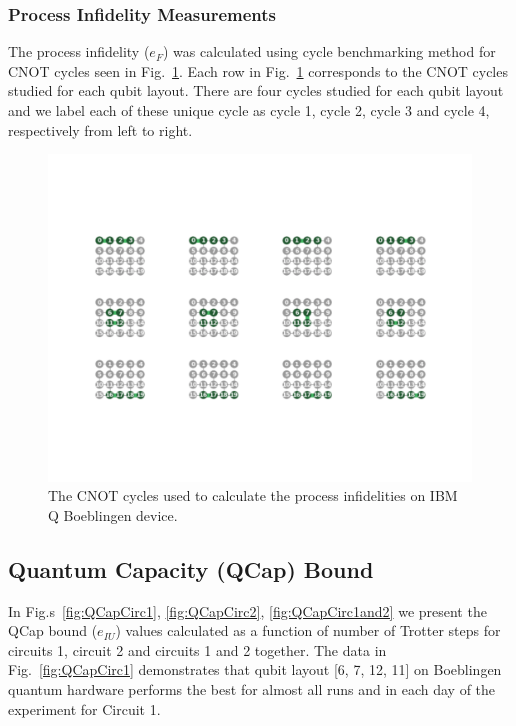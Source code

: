 \subsubsection{Process Infidelity Measurements}
The process infidelity ($e_{F}$) was calculated using cycle benchmarking method for CNOT cycles seen in Fig.~\ref{fig:BoeblingenCycles}. Each row in Fig.~\ref{fig:BoeblingenCycles} corresponds to the CNOT cycles  studied for each qubit layout. There are four cycles studied for each qubit layout and we label each of these unique cycle as cycle 1, cycle 2, cycle 3 and cycle 4, respectively from left to right.
\begin{figure}[ht!]
    \includegraphics[scale=0.4]{BoeblingenCycles.pdf}
    \caption{The CNOT cycles used to calculate the process infidelities on IBM Q Boeblingen device.}
    \label{fig:BoeblingenCycles}
\end{figure}






\subsection{Quantum Capacity (QCap) Bound}
In Fig.s~\ref{fig:QCapCirc1}, \ref{fig:QCapCirc2}, \ref{fig:QCapCirc1and2} we present the QCap bound ($e_{IU}$) values calculated as a function of number of Trotter steps for circuits 1, circuit 2 and circuits 1 and 2 together. The data in Fig.~\ref{fig:QCapCirc1} demonstrates that qubit layout [6, 7, 12, 11] on Boeblingen quantum hardware performs the best for almost all runs and in each day of the experiment for Circuit 1. 

